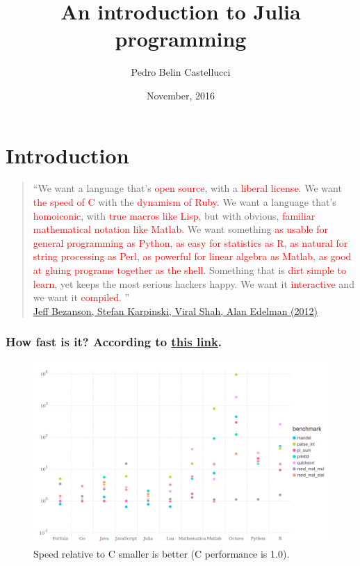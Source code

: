 \documentclass{beamer}
\title[Your Short Title]{An introduction to Julia programming}
\author{Pedro Belin Castellucci}
\date{November, 2016}
\begin{document}


\begin{frame}
  \titlepage
\end{frame}


\section{Introduction}

\begin{frame}
  \begin{quote}\footnotesize

  ``We want a language that’s \textcolor<2->{red}{open source}, with a \textcolor<3->{red}{liberal license}. We want \textcolor<4->{red}{the speed of C} with the \textcolor<5->{red}{dynamism of Ruby}. We want a language that’s \textcolor<6->{red}{homoiconic}, with \textcolor<7->{red}{true macros like Lisp}, but with obvious, \textcolor<8->{red}{familiar mathematical notation like Matlab}. We want something \textcolor<9->{red}{as usable for general programming as Python}, \textcolor<10->{red}{as easy for statistics as R}, \textcolor<11->{red}{as natural for string processing as Perl}, \textcolor<12->{red}{as powerful for linear algebra as Matlab}, \textcolor<13->{red}{as good at gluing programs together as the shell}. Something that is \textcolor<14->{red}{dirt simple to learn}, yet keeps the most serious hackers happy. We want it \textcolor<15->{red}{interactive} and we want it \textcolor<16->{red}{compiled}.
\newline
{}''\\
  \href{http://julialang.org/blog/2012/02/why-we-created-julia}{Jeff Bezanson, Stefan Karpinski, Viral Shah, Alan Edelman (2012)}
     \end{quote}
\end{frame}


\begin{frame}
  \frametitle{How fast is it? According to \href{http://julialang.org/benchmarks/}{this link}.}
  \begin{figure}[htpb]
    \centering
    \includegraphics[scale=0.2]{BenchmarkImage.png}
    \caption{Speed relative to C smaller is better (C performance is 1.0).}
    \label{fig:benchmark}
  \end{figure}
\end{frame}
\end{document}
